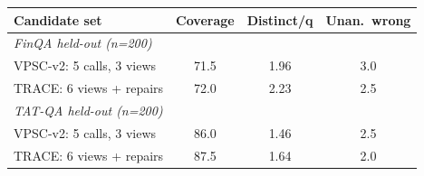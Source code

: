 \begin{tabular}{lccc}
\toprule
Candidate set & Coverage & Distinct/q & Unan.\ wrong \\
\midrule
\multicolumn{4}{l}{\emph{FinQA held-out (n=200)}} \\
VPSC-v2: 5 calls, 3 views & 71.5 & 1.96 & 3.0 \\
TRACE: 6 views + repairs & 72.0 & 2.23 & 2.5 \\
\midrule
\multicolumn{4}{l}{\emph{TAT-QA held-out (n=200)}} \\
VPSC-v2: 5 calls, 3 views & 86.0 & 1.46 & 2.5 \\
TRACE: 6 views + repairs & 87.5 & 1.64 & 2.0 \\
\bottomrule
\end{tabular}
